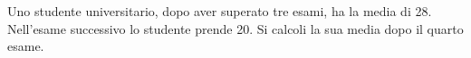 Uno studente universitario, dopo aver superato tre esami, 
ha la media di 28. Nell'esame successivo lo studente prende 20. 
Si calcoli la sua media dopo il quarto esame.